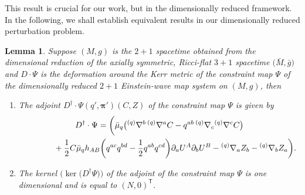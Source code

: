\documentclass[11pt]{article}
\numberwithin{equation}{section}
\def\ptl{\partial}%
\def\mbo#1{\boldsymbol{#1}}%
\def\grad{{\nabla}}%
\newcommand{\leftexp}[2]{{\vphantom{#2}}^{#1}{#2}}
\def\halb{\frac{1}{2}}%
\numberwithin{equation}{section}
\newtheorem{Lemma}[Theorem]{Lemma}
\begin{document}
 This result is crucial for our work, but in the dimensionally reduced framework. In the following, we shall establish equivalent results in our dimensionally reduced perturbation problem.
\begin{Lemma}
Suppose $(M, g)$ is the $2+1$ spacetime obtained from the dimensional reduction of the axially symmetric, Ricci-flat $3+1$ spacetime $\bigl(\bar{M}, \bar{g}\bigr)$ and $D \cdot \Psi$ is the deformation around the Kerr metric of the constraint map $\Psi$ of the dimensionally reduced $2+1$ Einstein-wave map system on $(M, g)$, then
\begin{enumerate}\itemsep=0pt
\item[$(1)$] The adjoint $D^\dagger \cdot \Psi (q', \mbo{\pi}') (C, Z) $ of the constraint map $\Psi$ is given by
\begin{gather}
D^{\dagger} \cdot \Psi = \biggl(\bar{\mu}_q \bigl(\leftexp{(q)}{\grad}^b \,\leftexp{(q)}{\grad}^a C -q^{ab}\, \leftexp{(q)}{\grad}_c \leftexp{(q)}{\grad}^c C\bigr)\nonumber\\
\hphantom{D^{\dagger} \cdot \Psi =}{}
+ \halb C \bar{\mu}_q h_{AB} \biggl(q^{ac}q^{bd} - \halb q^{ab} q^{cd}\biggr)\ptl_a U^A \ptl_b U^B
 - \leftexp{(q)}{\grad}_a Z_b - \leftexp{(q)}{\grad}_b Z_a \biggr).\label{2+1adjoint}
\end{gather}

\item[$(2)$] The kernel $\bigl(\operatorname{ker} \bigl(D^\dagger \Psi\bigr)\bigr)$ of the adjoint of the constraint map $\Psi$ is one dimensional and is equal to
$(N, 0)^{\mathsf{T}}$.
\end{enumerate}
\end{Lemma}
\end{document}
